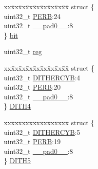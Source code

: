 \begin{DoxyCompactItemize}
\begin{tabbing}
\end{tabbing}\item 
\begin{tabbing}
xx\=xx\=xx\=xx\=xx\=xx\=xx\=xx\=xx\=\kill
struct \{\\
\>uint32\_t \mbox{\hyperlink{union_t_c_c___p_e_r_b___type_a097c0f751731b2d8c768978685a6c55f}{PERB}}:24\\
\>uint32\_t \mbox{\hyperlink{union_t_c_c___p_e_r_b___type_a3e57c2ef1c3ffb36722f000cc1156824}{\_\_pad0\_\_}}:8\\
\} \mbox{\hyperlink{union_t_c_c___p_e_r_b___type_a637d30c877598ce591ee8597c7e3dd18}{bit}}\\

\end{tabbing}\item 
uint32\+\_\+t \mbox{\hyperlink{union_t_c_c___p_e_r_b___type_a6b91636401516a477989a336376d7b40}{reg}}
\item 
\begin{tabbing}
xx\=xx\=xx\=xx\=xx\=xx\=xx\=xx\=xx\=\kill
struct \{\\
\>uint32\_t \mbox{\hyperlink{union_t_c_c___p_e_r_b___type_a156fbeb3ca1ed9f6622afd99724ad24c}{DITHERCYB}}:4\\
\>uint32\_t \mbox{\hyperlink{union_t_c_c___p_e_r_b___type_a097c0f751731b2d8c768978685a6c55f}{PERB}}:20\\
\>uint32\_t \mbox{\hyperlink{union_t_c_c___p_e_r_b___type_a3e57c2ef1c3ffb36722f000cc1156824}{\_\_pad0\_\_}}:8\\
\} \mbox{\hyperlink{union_t_c_c___p_e_r_b___type_a76dd7f277614872a89647f3161d97f57}{DITH4}}\\

\end{tabbing}\item 
\begin{tabbing}
xx\=xx\=xx\=xx\=xx\=xx\=xx\=xx\=xx\=\kill
struct \{\\
\>uint32\_t \mbox{\hyperlink{union_t_c_c___p_e_r_b___type_a156fbeb3ca1ed9f6622afd99724ad24c}{DITHERCYB}}:5\\
\>uint32\_t \mbox{\hyperlink{union_t_c_c___p_e_r_b___type_a097c0f751731b2d8c768978685a6c55f}{PERB}}:19\\
\>uint32\_t \mbox{\hyperlink{union_t_c_c___p_e_r_b___type_a3e57c2ef1c3ffb36722f000cc1156824}{\_\_pad0\_\_}}:8\\
\} \mbox{\hyperlink{union_t_c_c___p_e_r_b___type_a78b35ff19916235cfcb705bf9a220817}{DITH5}}\\


\end{tabbing}
\end{DoxyCompactItemize}

